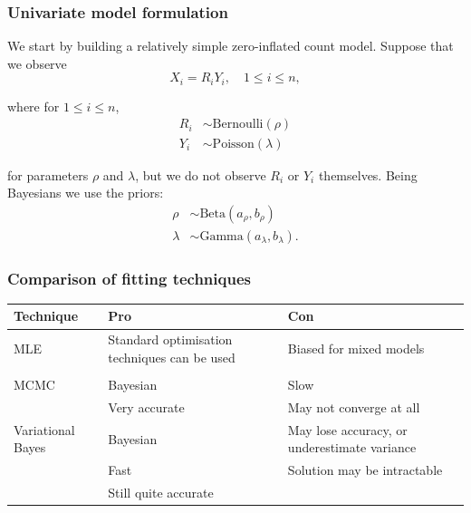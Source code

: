 \documentclass{beamer}
\begin{document}
\begin{frame}
\frametitle{Univariate model formulation}

We start by building a relatively simple zero-inflated count model. Suppose that we observe
$$
X_i = R_i Y_i, \quad 1\le i\le n,
$$

\noindent where for $1\le i\le n$,
\begin{align*} 
R_i &\sim \text{Bernoulli}(\rho) \\
Y_i &\sim \text{Poisson}(\lambda)
\end{align*}

\noindent for parameters $\rho$ and $\lambda$,
but we do not observe $R_i$ or $Y_i$ themselves.
Being Bayesians we use the priors:
\begin{align*} 
\rho &\sim \text{Beta}(a_\rho, b_\rho) \\
\lambda &\sim \text{Gamma}(a_\lambda, b_\lambda).
\end{align*}


\end{frame}






\begin{frame}
\frametitle{Comparison of fitting techniques}
\begin{tabular}{p{2cm}p{3.75cm}p{3.75cm}}
Technique & Pro & Con \\
\hline
MLE & Standard optimisation techniques can be used & Biased for mixed models \\
& & \\ %
\hline
MCMC & Bayesian & Slow \\
	& Very accurate &  May not converge at all \\
\hline
Variational Bayes & Bayesian & May lose accuracy, or underestimate variance \\
& Fast  & Solution may be intractable \\ 
& Still quite accurate & \\
\hline
\end{tabular}

\end{frame}
\end{document}
